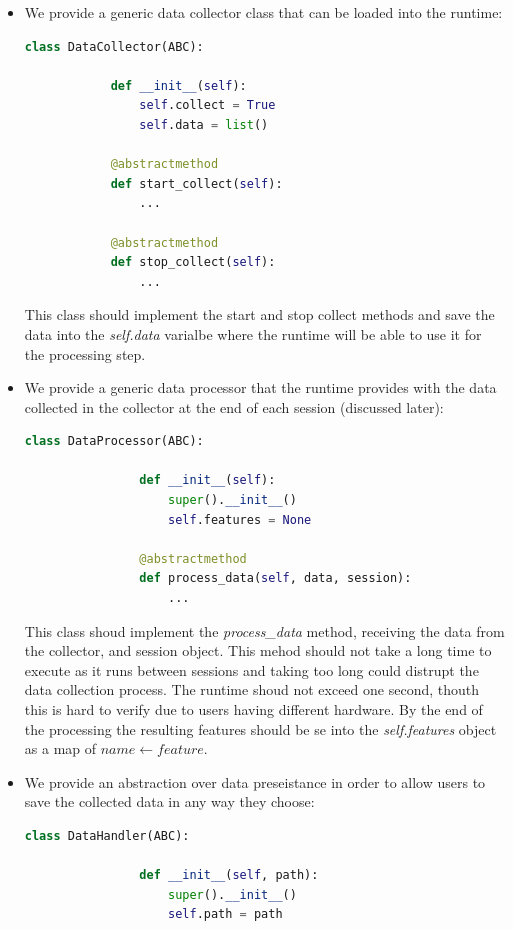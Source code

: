  \begin{itemize}
    \item We provide a generic data collector class that 	can be loaded into the runtime:
        \begin{lstlisting}[language=Python]
        class DataCollector(ABC):

            def __init__(self):
                self.collect = True
                self.data = list()

            @abstractmethod
            def start_collect(self):
                ...

            @abstractmethod
            def stop_collect(self):
                ...
        \end{lstlisting}
        This class should implement the start and stop collect methods and save the data into the \textit{self.data} varialbe where
        the runtime will be able to use it for the processing step.
    \item We provide a generic data processor that the runtime provides with the data collected in the collector at the end of each session (discussed later):
        \begin{lstlisting}[language=Python]
            class DataProcessor(ABC):

                def __init__(self):
                    super().__init__()
                    self.features = None

                @abstractmethod
                def process_data(self, data, session):
                    ...
        \end{lstlisting}

        This class shoud implement the \textit{process\_data} method, receiving the data from the collector, and session object. This mehod should not take a long time
        to execute as it runs between sessions and taking too long could distrupt the data collection process. The runtime shoud not exceed one second, thouth this 
        is hard to verify due to users having different hardware. By the end of the processing the resulting features should be se into the \textit{self.features} object 
        as a map of $name \leftarrow feature$.
    \item We provide an abstraction over data preseistance in order to allow users to save the collected data in any way they choose:
        \begin{lstlisting}[language=Python]
            class DataHandler(ABC):

                def __init__(self, path):
                    super().__init__()
                    self.path = path


\end{lstlisting}
\end{itemize}
